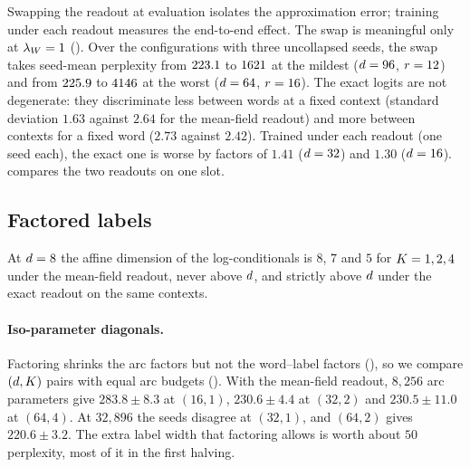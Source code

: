 \begin{table}[t]
\centering\scriptsize\setlength{\tabcolsep}{2pt}

\caption{WikiText-2 with every hyperparameter carried over from PTB. `fixed' and `rule': the
causal PT under the original temperature (damped) and the standardised temperature (undamped),
three seeds; `gpt' and `looped':
causal and looped transformer (two seeds). Unigram $964.8$, bigram $692.5$.}
\label{tab:wt2}
\end{table}

Swapping the readout at evaluation isolates the approximation error; training under each readout
measures the end-to-end effect. The swap is meaningful only at $\lambda_W=1$
(). Over the \SwapNconfigs{} configurations with three uncollapsed
seeds, the swap takes seed-mean perplexity from $223.1$ to $1621$ at
the mildest ($d=96$, $r=12$) and from $225.9$ to
$4146$ at the worst ($d=64$, $r=16$). The exact
logits are not degenerate: they discriminate less between words at a fixed context (standard
deviation $1.63$ against $2.64$ for the mean-field readout) and more between contexts for a fixed
word ($2.73$ against $2.42$). Trained under each readout (one seed each), the exact one is worse
by factors of $1.41$ ($d=32$) and $1.30$ ($d=16$).  compares the two readouts
on one slot.

\subsection{Factored labels}
\label{app:grid-factored}

At $d=8$ the affine dimension of the log-conditionals is $8$, $7$ and $5$ for $K=1,2,4$
under the mean-field readout, never above $d$, and strictly above $d$ under the exact
readout on the same contexts.

\paragraph{Iso-parameter diagonals.}
Factoring shrinks the arc factors but not the word--label factors (), so we
compare $(d,K)$ pairs with equal arc budgets (). With the mean-field
readout, $8{,}256$ arc parameters give $283.8\pm8.3$ at $(16,1)$, $230.6\pm4.4$ at $(32,2)$ and
$230.5\pm11.0$ at $(64,4)$. At $32{,}896$ the seeds disagree at $(32,1)$, and $(64,2)$ gives
$220.6\pm3.2$. The extra label width that factoring allows is worth about $50$ perplexity, most
of it in the first halving.

